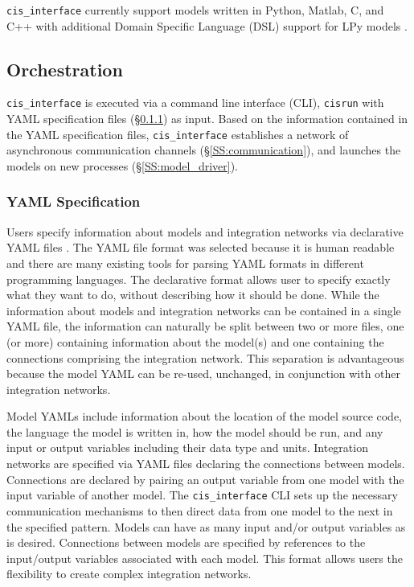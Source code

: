\documentclass[journal]{IEEEtran}
\newcommand{\cis}{{\tt cis\_interface}{}}
\begin{document}
{\cis} currently support models written in Python, Matlab, C, and C++ with 
additional Domain Specific Language (DSL) support for LPy models \citep{Boudon2012}. 

\subsection{Orchestration}\label{SS:orchestration}
%
{\cis} is executed via a command line interface (CLI), {\tt cisrun} with YAML specification files (\S\ref{SSS:yaml}) as input. Based on the information contained in the YAML specification files, {\cis} establishes a network of asynchronous communication channels (\S\ref{SS:communication}), and launches the models on new processes (\S\ref{SS:model_driver}).

\subsubsection{YAML Specification}\label{SSS:yaml}
%
Users specify information about models and integration networks via declarative 
YAML files \citep{Ben-Kiki2009}. The YAML file format was selected because it is human readable 
and there are many existing tools for parsing YAML formats in different programming 
languages. The declarative format allows user to specify exactly what they 
want to do, without describing how it should be done. While the information 
about models and integration networks can be contained in a single YAML 
file, the information can naturally be split between two or more files, one (or more) containing 
information about the model(s) and one containing the connections comprising the 
integration network. This separation is advantageous because the model YAML 
can be re-used, unchanged, in conjunction with other integration networks. 

Model YAMLs include information about the location of the 
model source code, the language the model is written in, how the model should 
be run, and any input or output variables including their data type and units. 
Integration networks are specified via YAML files declaring the connections 
between models. Connections are declared by pairing an output variable from 
one model with the input variable of another model. The {\cis} 
CLI sets up the necessary communication mechanisms to 
then direct data from one model to the next in the specified pattern. Models 
can have as many input and/or output variables as is desired.
Connections between models are specified by references to the 
input/output variables associated with each model. This format allows users the 
flexibility to create complex integration networks. 
\end{document}
